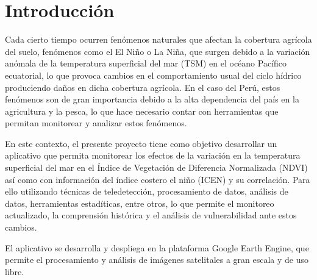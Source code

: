 \vspace*{\fill}

\section{Introducción}

  Cada cierto tiempo ocurren fenómenos naturales que afectan la cobertura agrícola del suelo, fenómenos como el El Niño o La Niña, que surgen debido a la variación anómala de la temperatura superficial del mar (TSM) en el océano Pacífico ecuatorial, lo que provoca cambios en el comportamiento usual del ciclo hídrico produciendo daños en dicha cobertura agrícola. En el caso del Perú, estos fenómenos son de gran importancia debido a la alta dependencia del país en la agricultura y la pesca, lo que hace necesario contar con herramientas que permitan monitorear y analizar estos fenómenos.

  En este contexto, el presente proyecto tiene como objetivo desarrollar un aplicativo que permita monitorear los efectos de la variación en la temperatura superficial del mar en el Índice de Vegetación de Diferencia Normalizada (NDVI) así como con información del índice costero el niño (ICEN) y su correlación. Para ello utilizando técnicas de teledetección, procesamiento de datos, análisis de datos, herramientas estadíticas, entre otros, lo que permite el monitoreo actualizado, la comprensión histórica y el análisis de vulnerabilidad ante estos cambios.

  El aplicativo se desarrolla y despliega en la plataforma Google Earth Engine, que permite el procesamiento y análisis de imágenes satelitales a gran escala y de uso libre.

\vspace*{\fill}